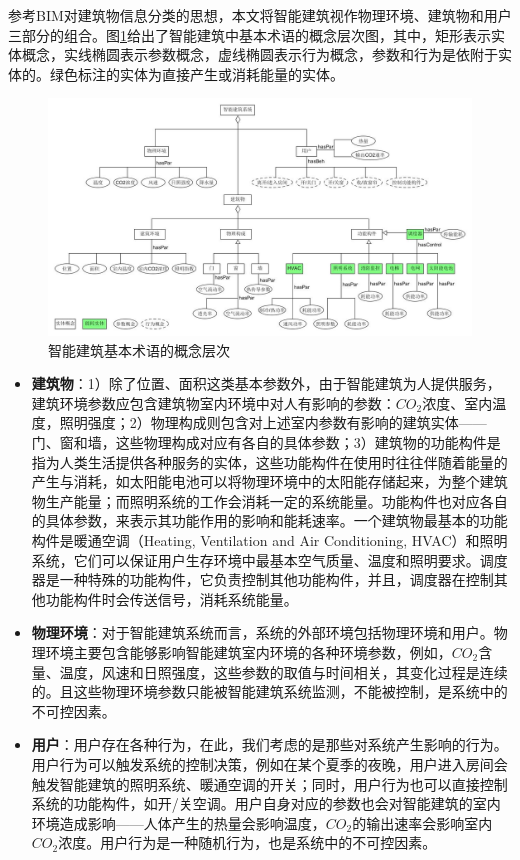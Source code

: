 	参考BIM对建筑物信息分类的思想，本文将智能建筑视作物理环境、建筑物和用户三部分的组合。图\ref{ontology_sb}给出了智能建筑中基本术语的概念层次图，其中，矩形表示实体概念，实线椭圆表示参数概念，虚线椭圆表示行为概念，参数和行为是依附于实体的。绿色标注的实体为直接产生或消耗能量的实体。
	\begin{figure}[!t]
	\centering
	\includegraphics[width=6in]{ontology-sb-new.jpg}
	\caption{智能建筑基本术语的概念层次}
	\label{ontology_sb}
	\end{figure}
	
	\begin{itemize}
	\item \textbf{ 建筑物}：1）除了位置、面积这类基本参数外，由于智能建筑为人提供服务，建筑环境参数应包含建筑物室内环境中对人有影响的参数：$CO_{2}$浓度、室内温度，照明强度；2）物理构成则包含对上述室内参数有影响的建筑实体——门、窗和墙，这些物理构成对应有各自的具体参数；3）建筑物的功能构件是指为人类生活提供各种服务的实体，这些功能构件在使用时往往伴随着能量的产生与消耗，如太阳能电池可以将物理环境中的太阳能存储起来，为整个建筑物生产能量；而照明系统的工作会消耗一定的系统能量。功能构件也对应各自的具体参数，来表示其功能作用的影响和能耗速率。一个建筑物最基本的功能构件是暖通空调（Heating, Ventilation and Air Conditioning, HVAC）和照明系统，它们可以保证用户生存环境中最基本空气质量、温度和照明要求。调度器是一种特殊的功能构件，它负责控制其他功能构件，并且，调度器在控制其他功能构件时会传送信号，消耗系统能量。
	\item \textbf{物理环境}：对于智能建筑系统而言，系统的外部环境包括物理环境和用户。物理环境主要包含能够影响智能建筑室内环境的各种环境参数，例如，$CO_{2}$含量、温度，风速和日照强度，这些参数的取值与时间相关，其变化过程是连续的。且这些物理环境参数只能被智能建筑系统监测，不能被控制，是系统中的不可控因素。
	\item \textbf{用户}：用户存在各种行为，在此，我们考虑的是那些对系统产生影响的行为。用户行为可以触发系统的控制决策，例如在某个夏季的夜晚，用户进入房间会触发智能建筑的照明系统、暖通空调的开关；同时，用户行为也可以直接控制系统的功能构件，如开/关空调。用户自身对应的参数也会对智能建筑的室内环境造成影响\citep{Library2012American}——人体产生的热量会影响温度，$CO_{2}$的输出速率会影响室内$CO_{2}$浓度。用户行为是一种随机行为，也是系统中的不可控因素。
	\end{itemize}
	
